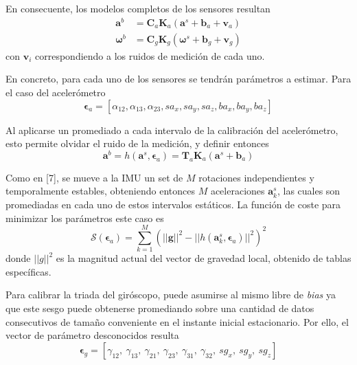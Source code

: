 En consecuente, los modelos completos de los sensores resultan
\begin{align}
    \bm{a}^b &= \bm{C}_a\bm{K}_a\left(\bm{a}^s + \bm{b}_a + \bm{v}_a\right) \\
    \bm{\omega}^b &= \bm{C}_g\bm{K}_g\left(\bm{\omega}^s + \bm{b}_g + \bm{v}_g\right)
\end{align}
con $\bm{v}_i$ correspondiendo a los ruidos de medición de cada uno.

En concreto, para cada uno de los sensores se tendrán parámetros a estimar. Para el caso del acelerómetro
\begin{equation}
    \bm{\epsilon}_{a} = [\alpha_{12},\alpha_{13},\alpha_{23},sa_x,sa_y,sa_z,ba_x,ba_y,ba_z]
    \label{eq:accelcalibrationparams}
\end{equation}

Al aplicarse un promediado a cada intervalo de la calibración del acelerómetro, esto permite olvidar el ruido de la medición, y definir entonces
\begin{equation}
    \bm{a}^b = h(\bm{a}^s,\bm{\epsilon}_{a}) = \bm{T}_a\bm{K}_a(\bm{a}^s+\bm{b}_a)    
\end{equation}

Como en [7], se mueve a la IMU un set de $M$ rotaciones independientes y temporalmente estables, obteniendo entonces $M$ aceleraciones $\bm{a}^s_k$, las cuales son promediadas en cada uno de estos intervalos estáticos. La función de coste para minimizar los parámetros este caso es
\begin{equation}
    \mathscr{S}(\bm{\epsilon}_{a}) = \sum_{k=1}^M(||\bm{g}||^2-||h(\bm{a}^s_k,\bm{\epsilon}_{a})||^2)^2
    \label{eq:generalaccelcostfunction}
\end{equation}
donde $||g||^2$ es la magnitud actual del vector de gravedad local, obtenido de tablas específicas.

Para calibrar la triada del giróscopo, puede asumirse al mismo libre de \textit{bias} ya que este sesgo puede obtenerse promediando sobre una cantidad de datos consecutivos de tamaño conveniente en el instante inicial estacionario. Por ello, el vector de parámetro desconocidos resulta
\begin{equation}
    \bm{\epsilon}_{g} = \left[\gamma_{12},\ \gamma_{13},\ \gamma_{21},\ \gamma_{23},\ \gamma_{31},\ \gamma_{32},\ sg_x,\ sg_y,\ sg_z\right]
    \label{eq:gyrocalibrationparams}
\end{equation}

